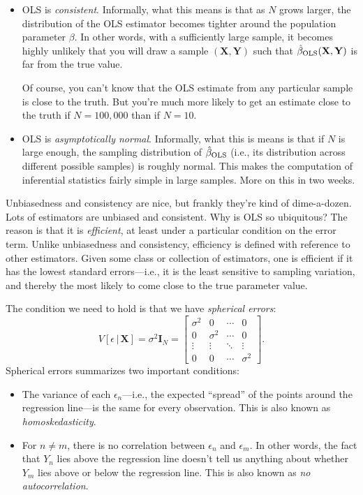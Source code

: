 \documentclass[12pt,oneside,openany]{book}
\begin{document}
\begin{itemize}
\item
  OLS is \emph{consistent}. Informally, what this means is that as \(N\)
  grows larger, the distribution of the OLS estimator becomes tighter
  around the population parameter \(\beta\). In other words, with a
  sufficiently large sample, it becomes highly unlikely that you will
  draw a sample \((\mathbf{X}, \mathbf{Y})\) such that
  \(\hat{\beta}_{\text{OLS}}(\mathbf{X}, \mathbf{Y})\) is far from the true
  value.

  Of course, you can't know that the OLS estimate from any particular
  sample is close to the truth. But you're much more likely to get an
  estimate close to the truth if \(N = 100{,}000\) than if \(N = 10\).
\item
  OLS is \emph{asymptotically normal}. Informally, what this is means is
  that if \(N\) is large enough, the sampling distribution of
  \(\hat{\beta}_{\text{OLS}}\) (i.e., its distribution across different
  possible samples) is roughly normal. This makes the computation of
  inferential statistics fairly simple in large samples. More on this in
  two weeks.
\end{itemize}

Unbiasedness and consistency are nice, but frankly they're kind of
dime-a-dozen. Lots of estimators are unbiased and consistent. Why is OLS
so ubiquitous? The reason is that it is \emph{efficient}, at least under
a particular condition on the error term. Unlike unbiasedness and
consistency, efficiency is defined with reference to other estimators.
Given some class or collection of estimators, one is efficient if it has
the lowest standard errors---i.e., it is the least sensitive to sampling
variation, and thereby the most likely to come close to the true
parameter value.

The condition we need to hold is that we have \emph{spherical errors}:
\[
V[\epsilon \,|\, \mathbf{X}] = \sigma^2 \mathbf{I}_N
= \begin{bmatrix}
  \sigma^2 & 0 & \cdots & 0 \\
  0 & \sigma^2 & \cdots & 0 \\
  \vdots & \vdots & \ddots & \vdots \\
  0 & 0 & \cdots & \sigma^2
\end{bmatrix}.
\] Spherical errors summarizes two important conditions:

\begin{itemize}
\item
  The variance of each \(\epsilon_n\)---i.e., the expected ``spread'' of
  the points around the regression line---is the same for every
  observation. This is also known as \emph{homoskedasticity}.
\item
  For \(n \neq m\), there is no correlation between \(\epsilon_n\) and
  \(\epsilon_m\). In other words, the fact that \(Y_n\) lies above the
  regression line doesn't tell us anything about whether \(Y_m\) lies
  above or below the regression line. This is also known as \emph{no
  autocorrelation}.
\end{itemize}
\end{document}
